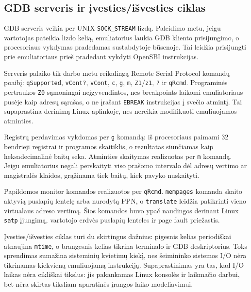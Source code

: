 \subsection{GDB serveris ir įvesties/išvesties ciklas}
\label{sec:gdb-ir-ivestis-isvestis}

GDB serveris veikia per UNIX \texttt{SOCK\_STREAM} lizdą. Paleidimo metu, jeigu vartotojas pateikia lizdo kelią, emuliatorius laukia GDB kliento prisijungimo, o procesoriaus vykdymas pradedamas sustabdytoje būsenoje. Tai leidžia prisijungti prie emuliatoriaus prieš pradedant vykdyti OpenSBI instrukcijas.

Serveris palaiko tik darbo metu reikalingą Remote Serial Protocol komandų poaibį: \texttt{qSupported}, \texttt{vCont?}, \texttt{vCont}, \texttt{c}, \texttt{g}, \texttt{m}, \texttt{Z1}/\texttt{z1}, \texttt{?} ir \texttt{qRcmd}. Programinės pertraukos \texttt{Z0} sąmoningai neįgyvendintos, nes breakpoints laikomi emuliatoriaus pusėje kaip adresų sąrašas, o ne įrašant \texttt{EBREAK} instrukcijas į svečio atmintį. Tai supaprastina derinimą Linux aplinkoje, nes nereikia modifikuoti emuliuojamos atminties.

Registrų perdavimas vykdomas per \texttt{g} komandą: iš procesoriaus paimami 32 bendrieji registrai ir programos skaitiklis, o rezultatas siunčiamas kaip heksadecimalinė baitų seka. Atminties skaitymas realizuotas per \texttt{m} komandą. Jeigu emuliatorius negali perskaityti viso prašomo intervalo dėl adresų vertimo ar magistralės klaidos, grąžinama tiek baitų, kiek pavyko nuskaityti.

Papildomos monitor komandos realizuotos per \texttt{qRcmd}. \texttt{mempages} komanda skaito aktyvią puslapių lentelę arba nurodytą PPN, o \texttt{translate} leidžia patikrinti vieno virtualaus adreso vertimą. Šios komandos buvo ypač naudingos derinant Linux \texttt{satp} įjungimą, vartotojo erdvės puslapių lenteles ir page fault priežastis.

Įvesties/išvesties ciklas turi du skirtingus dažnius: pigesnis kelias periodiškai atnaujina \texttt{mtime}, o brangesnis kelias tikrina terminalo ir GDB deskriptorius. Toks sprendimas sumažina sisteminių kvietimų kiekį, nes šeimininko sistemos I/O nėra tikrinamas kiekvieną emuliuojamą instrukciją. Supaprastinimas yra tas, kad I/O laikas nėra cikliškai tikslus: jis pakankamas Linux konsolės ir laikmačio darbui, bet nėra skirtas tiksliam aparatinės įrangos laiko modeliavimui.

